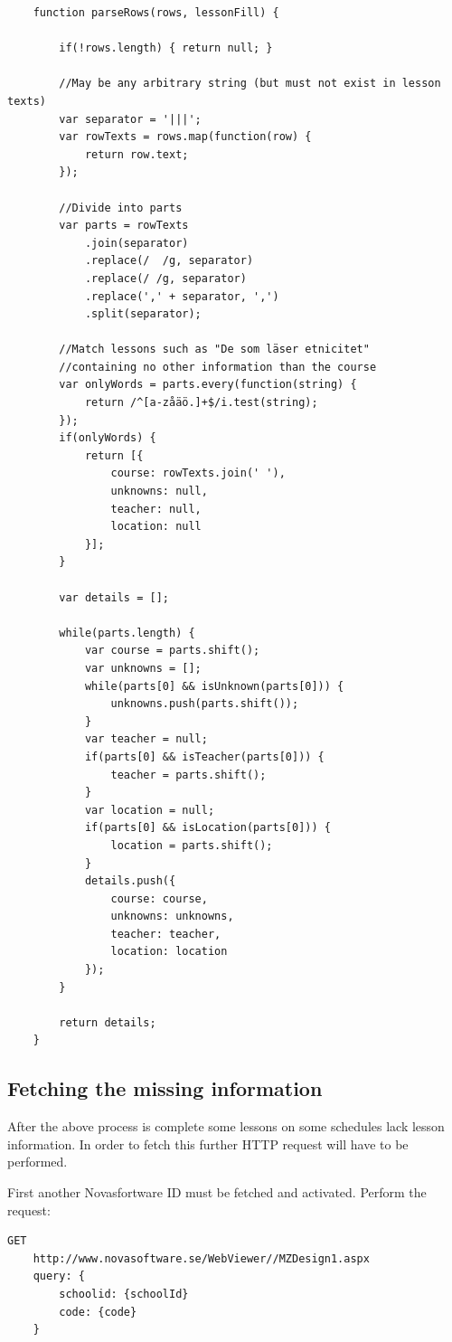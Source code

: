 \documentclass{article}
\begin{document}
	\medskip
	\begin{lstlisting}
	function parseRows(rows, lessonFill) {
	
		if(!rows.length) { return null; }
		
		//May be any arbitrary string (but must not exist in lesson texts)
		var separator = '|||';
		var rowTexts = rows.map(function(row) {
			return row.text;
		});
		
		//Divide into parts
		var parts = rowTexts
			.join(separator)
			.replace(/  /g, separator)
			.replace(/ /g, separator)
			.replace(',' + separator, ',')
			.split(separator);
		
		//Match lessons such as "De som läser etnicitet"
		//containing no other information than the course
		var onlyWords = parts.every(function(string) {
			return /^[a-zåäö.]+$/i.test(string);
		});
		if(onlyWords) {
			return [{
				course: rowTexts.join(' '),
				unknowns: null,
				teacher: null,
				location: null
			}];
		}
		
		var details = [];
		
		while(parts.length) {
			var course = parts.shift();
			var unknowns = [];
			while(parts[0] && isUnknown(parts[0])) {
				unknowns.push(parts.shift());
			}
			var teacher = null;
			if(parts[0] && isTeacher(parts[0])) {
				teacher = parts.shift();
			}
			var location = null;
			if(parts[0] && isLocation(parts[0])) {
				location = parts.shift();
			}
			details.push({
				course: course,
				unknowns: unknowns,
				teacher: teacher,
				location: location
			});
		}
		
		return details;
	}
	\end{lstlisting}
	
	
	\subsection{Fetching the missing information}
	After the above process is complete some lessons on some schedules lack lesson information. In order to fetch this further HTTP request will have to be performed.
	
	First another Novasfortware ID must be fetched and activated. Perform the request:
	
	\begin{lstlisting}[language=HTTP, style=nonumbers]
	GET
	http://www.novasoftware.se/WebViewer//MZDesign1.aspx
	query: {
		schoolid: {schoolId}
		code: {code}
	}
	\end{lstlisting}
	
\end{document}
